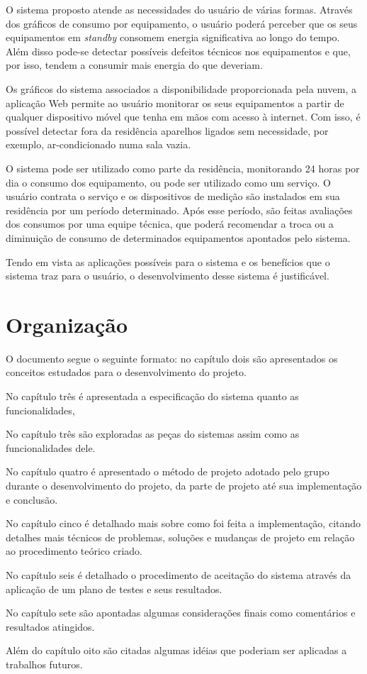 O sistema proposto atende as necessidades do usuário de várias formas. Através dos gráficos de consumo por equipamento, o usuário poderá perceber que os seus equipamentos em \textit{standby} consomem energia significativa ao longo do tempo. Além disso pode-se detectar possíveis defeitos técnicos nos equipamentos e que, por isso, tendem a consumir mais energia do que deveriam.

Os gráficos do sistema associados a disponibilidade proporcionada pela nuvem, a aplicação Web permite ao usuário monitorar os seus equipamentos a partir de qualquer dispositivo móvel que tenha em mãos com acesso à internet. Com isso, é possível detectar fora da residência aparelhos ligados sem necessidade, por exemplo, ar-condicionado numa sala vazia.

O sistema pode ser utilizado como parte da residência, monitorando 24 horas por dia o consumo dos equipamento, ou pode ser utilizado como um serviço. O usuário contrata o serviço e os dispositivos de medição são instalados em sua residência por um período determinado. Após esse período, são feitas avaliações dos consumos por uma equipe técnica, que poderá recomendar a troca ou a diminuição de consumo de determinados equipamentos apontados pelo sistema.

Tendo em vista as aplicações possíveis para o sistema e os benefícios que o sistema traz para o usuário, o desenvolvimento desse sistema é justificável.

\section{Organização}
\label{Sec:organizacao}

O documento segue o seguinte formato: no capítulo dois são apresentados os conceitos estudados para o desenvolvimento do projeto.

No capítulo três é apresentada a especificação do sistema quanto as funcionalidades, 

No capítulo três são exploradas as peças do sistemas assim como as funcionalidades dele.

No capítulo quatro é apresentado o método de projeto adotado pelo grupo durante o desenvolvimento do projeto, da parte de projeto até sua implementação e conclusão.

No capítulo cinco é detalhado mais sobre como foi feita a implementação, citando detalhes mais técnicos de problemas, soluções e mudanças de projeto em relação ao procedimento teórico criado.

No capítulo seis é detalhado o procedimento de aceitação do sistema através da aplicação de um plano de testes e seus resultados.

No capítulo sete são apontadas algumas considerações finais como comentários e resultados atingidos.

Além do capítulo oito são citadas algumas idéias que poderiam ser aplicadas a trabalhos futuros.
